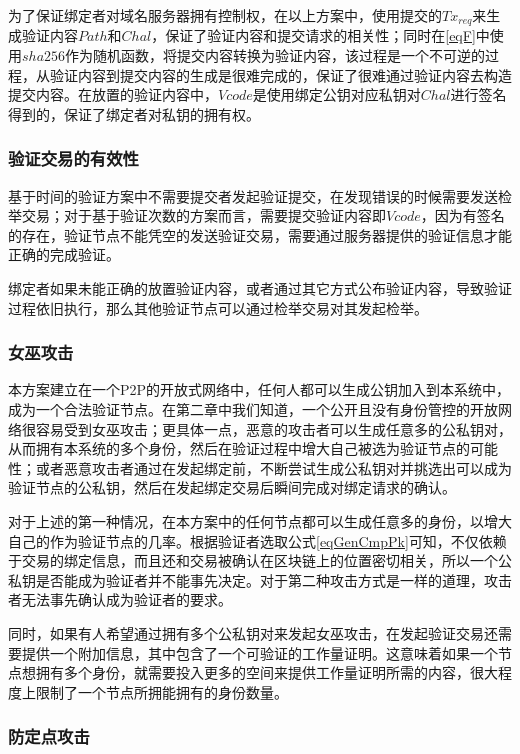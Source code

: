 为了保证绑定者对域名服务器拥有控制权，在以上方案中，使用提交的$Tx_{req}$来生成验证内容$Path$和$Chal$，保证了验证内容和提交请求的相关性；同时在\eqref{eqF}中使用$sha256$作为随机函数，将提交内容转换为验证内容，该过程是一个不可逆的过程，从验证内容到提交内容的生成是很难完成的，保证了很难通过验证内容去构造提交内容。在放置的验证内容中，$Vcode$是使用绑定公钥对应私钥对$Chal$进行签名得到的，保证了绑定者对私钥的拥有权。


\subsubsection{验证交易的有效性}

基于时间的验证方案中不需要提交者发起验证提交，在发现错误的时候需要发送检举交易；对于基于验证次数的方案而言，需要提交验证内容即$Vcode$，因为有签名的存在，验证节点不能凭空的发送验证交易，需要通过服务器提供的验证信息才能正确的完成验证。

绑定者如果未能正确的放置验证内容，或者通过其它方式公布验证内容，导致验证过程依旧执行，那么其他验证节点可以通过检举交易对其发起检举。


\subsubsection{女巫攻击}

本方案建立在一个P2P的开放式网络中，任何人都可以生成公钥加入到本系统中，成为一个合法验证节点。在第二章中我们知道，一个公开且没有身份管控的开放网络很容易受到女巫攻击；更具体一点，恶意的攻击者可以生成任意多的公私钥对，从而拥有本系统的多个身份，然后在验证过程中增大自己被选为验证节点的可能性；或者恶意攻击者通过在发起绑定前，不断尝试生成公私钥对并挑选出可以成为验证节点的公私钥，然后在发起绑定交易后瞬间完成对绑定请求的确认。

对于上述的第一种情况，在本方案中的任何节点都可以生成任意多的身份，以增大自己的作为验证节点的几率。根据验证者选取公式\ref{eqGenCmpPk}可知，不仅依赖于交易的绑定信息，而且还和交易被确认在区块链上的位置密切相关，所以一个公私钥是否能成为验证者并不能事先决定。对于第二种攻击方式是一样的道理，攻击者无法事先确认成为验证者的要求。

同时，如果有人希望通过拥有多个公私钥对来发起女巫攻击，在发起验证交易还需要提供一个附加信息，其中包含了一个可验证的工作量证明。这意味着如果一个节点想拥有多个身份，就需要投入更多的空间来提供工作量证明所需的内容，很大程度上限制了一个节点所拥能拥有的身份数量。                          

\subsubsection{防定点攻击}

